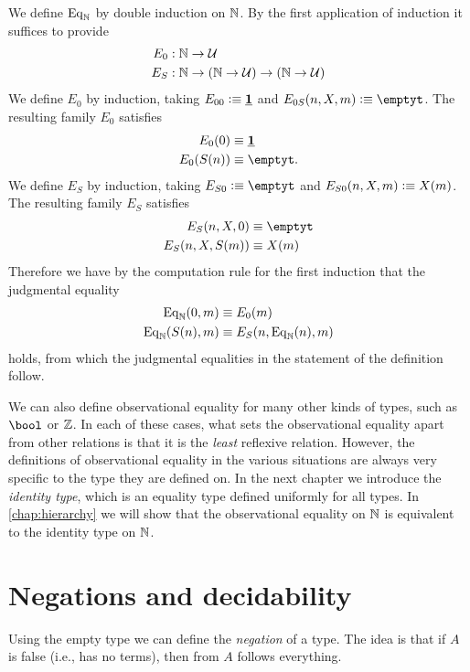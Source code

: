 \begin{constr}
We define $\mathrm{Eq}_\mathbb{N}$ by double induction on $\mathbb{N}$. By the first application of induction it suffices to provide
\begin{align*}
E_0 & : \mathbb{N}\to\mathcal{U} \\
E_S & : \mathbb{N}\to (\mathbb{N}\to\mathcal{U})\to(\mathbb{N}\to\mathcal{U})
\end{align*}
We define $E_0$ by induction, taking $E_{00}\vcentcolon\equiv \underline{\mathbf{1}}$ and $E_{0S}(n,X,m)\defeq \emptyt$. The resulting family $E_0$ satisfies
\begin{align*}
E_0(0) & \jdeq \unit \\
E_0(S(n)) & \jdeq \emptyt.
\end{align*} 
We define $E_S$ by induction, taking $E_{S0}\defeq \emptyt$ and $E_{S0}(n,X,m)\vcentcolon\equiv X(m)$. The resulting family $E_S$ satisfies
\begin{align*}
E_S(n,X,0) & \jdeq \emptyt \\
E_S(n,X,S(m)) & \jdeq X(m) 
\end{align*}
Therefore we have by the computation rule for the first induction that the judgmental equality
\begin{align*}
\mathrm{Eq}_\mathbb{N}(0,m) & \equiv E_0(m) \\
\mathrm{Eq}_\mathbb{N}(S(n),m) & \equiv E_S(n,\mathrm{Eq}_\mathbb{N}(n),m)
\end{align*}
holds, from which the judgmental equalities in the statement of the definition follow.
\end{constr}

We can also define observational equality for many other kinds of types, such as $\bool$ or $\mathbb{Z}$. In each of these cases, what sets the observational equality apart from other relations is that it is the \emph{least} reflexive relation. However, the definitions of observational equality in the various situations are always very specific to the type they are defined on. In the next chapter we introduce the \emph{identity type}, which is an equality type defined uniformly for all types. In \cref{chap:hierarchy} we will show that the observational equality on $\mathbb{N}$ is equivalent to the identity type on $\mathbb{N}$.

\section{Negations and decidability}
Using the empty type we can define the \emph{negation} of a type. The idea is that if $A$ is false (i.e., has no terms), then from $A$ follows everything.

